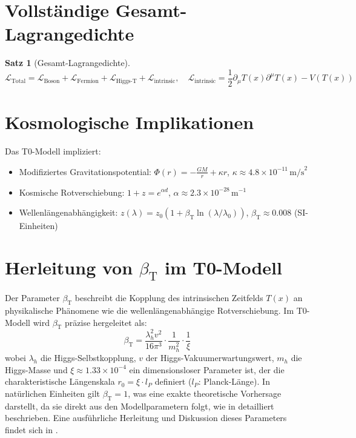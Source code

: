\documentclass[12pt,a4paper]{article}
\newcommand{\Tfield}{T(x)}
\newcommand{\betaT}{\beta_{\text{T}}}
\newtheorem{theorem}{Satz}[section]
\theoremstyle{definition}
\theoremstyle{remark}
\begin{document}
	\section{Vollständige Gesamt-Lagrangedichte}
	\begin{theorem}[Gesamt-Lagrangedichte]
		\begin{equation}
			\mathcal{L}_{\text{Total}} = \mathcal{L}_{\text{Boson}} + \mathcal{L}_{\text{Fermion}} + \mathcal{L}_{\text{Higgs-T}} + \mathcal{L}_{\text{intrinsic}}, \quad \mathcal{L}_{\text{intrinsic}} = \frac{1}{2} \partial_\mu \Tfield \partial^\mu \Tfield - V(\Tfield)
		\end{equation}
	\end{theorem}
	
	\section{Kosmologische Implikationen}
	Das T0-Modell impliziert:
	\begin{itemize}
		\item Modifiziertes Gravitationspotential: \( \Phi(r) = -\frac{GM}{r} + \kappa r \), \( \kappa \approx 4.8 \times 10^{-11} \, \text{m/s}^2 \)
		\item Kosmische Rotverschiebung: \( 1 + z = e^{\alpha d} \), \( \alpha \approx 2.3 \times 10^{-28} \, \text{m}^{-1} \)
		\item Wellenlängenabhängigkeit: \( z(\lambda) = z_0 (1 + \betaT \ln(\lambda/\lambda_0)) \), \( \betaT \approx 0.008 \) (SI-Einheiten)
	\end{itemize}
	\section{Herleitung von \(\betaT\) im T0-Modell}
	
	Der Parameter \(\betaT\) beschreibt die Kopplung des intrinsischen Zeitfelds \(\Tfield\) an physikalische Phänomene wie die wellenlängenabhängige Rotverschiebung. Im T0-Modell wird \(\betaT\) präzise hergeleitet als:
	\begin{equation}
		\betaT = \frac{\lambda_h^2 v^2}{16\pi^3} \cdot \frac{1}{m_h^2} \cdot \frac{1}{\xi}
	\end{equation}
	wobei \(\lambda_h\) die Higgs-Selbstkopplung, \(v\) der Higgs-Vakuumerwartungswert, \(m_h\) die Higgs-Masse und \(\xi \approx 1.33 \times 10^{-4}\) ein dimensionsloser Parameter ist, der die charakteristische Längenskala \(r_0 = \xi \cdot l_P\) definiert (\(l_P\): Planck-Länge). In natürlichen Einheiten gilt \(\betaT = 1\), was eine exakte theoretische Vorhersage darstellt, da sie direkt aus den Modellparametern folgt, wie in \cite{pascher_alphabeta_2025} detailliert beschrieben. Eine ausführliche Herleitung und Diskussion dieses Parameters findet sich in \cite{pascher_alphabeta_2025}.
	
\end{document}
